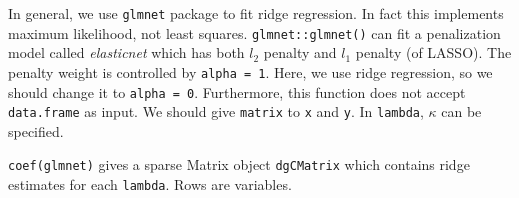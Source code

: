 \documentclass[]{book}
\newenvironment{Shaded}{\begin{snugshade}}{\end{snugshade}}
\newcommand{\CommentTok}[1]{\textcolor[rgb]{0.56,0.35,0.01}{\textit{#1}}}
\newcommand{\DataTypeTok}[1]{\textcolor[rgb]{0.13,0.29,0.53}{#1}}
\newcommand{\DecValTok}[1]{\textcolor[rgb]{0.00,0.00,0.81}{#1}}
\newcommand{\KeywordTok}[1]{\textcolor[rgb]{0.13,0.29,0.53}{\textbf{#1}}}
\newcommand{\NormalTok}[1]{#1}
\newcommand{\OperatorTok}[1]{\textcolor[rgb]{0.81,0.36,0.00}{\textbf{#1}}}
\newcommand{\StringTok}[1]{\textcolor[rgb]{0.31,0.60,0.02}{#1}}
\theoremstyle{definition}
\theoremstyle{definition}
\theoremstyle{definition}
\theoremstyle{remark}
\begin{document}
In general, we use \texttt{glmnet} package to fit ridge regression. In fact this implements maximum likelihood, not least squares. \texttt{glmnet::glmnet()} can fit a penalization model called \emph{elasticnet} which has both \(l_2\) penalty and \(l_1\) penalty (of LASSO). The penalty weight is controlled by \texttt{alpha\ =\ 1}. Here, we use ridge regression, so we should change it to \texttt{alpha\ =\ 0}. Furthermore, this function does not accept \texttt{data.frame} as input. We should give \texttt{matrix} to \texttt{x} and \texttt{y}. In \texttt{lambda}, \(\kappa\) can be specified.

\begin{Shaded}
\end{Shaded}

\texttt{coef(glmnet)} gives a sparse Matrix object \texttt{dgCMatrix} which contains ridge estimates for each \texttt{lambda}. Rows are variables.
\end{document}
